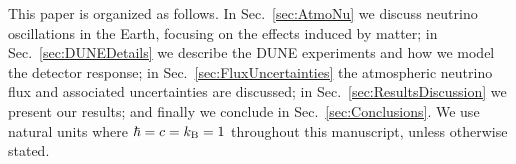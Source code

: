 This paper is organized as follows.
In Sec.~\ref{sec:AtmoNu} we discuss neutrino oscillations in the Earth, focusing on the effects induced by matter; in Sec.~\ref{sec:DUNEDetails} we describe the DUNE experiments and how we model the detector response; in Sec.~\ref{sec:FluxUncertainties} the atmospheric neutrino flux and associated uncertainties are discussed; in Sec.~\ref{sec:ResultsDiscussion} we present our results; and finally we conclude in Sec.~\ref{sec:Conclusions}.
We use natural units where $\hbar = c = k_{\rm B} = 1$ throughout this manuscript, unless otherwise stated. 











